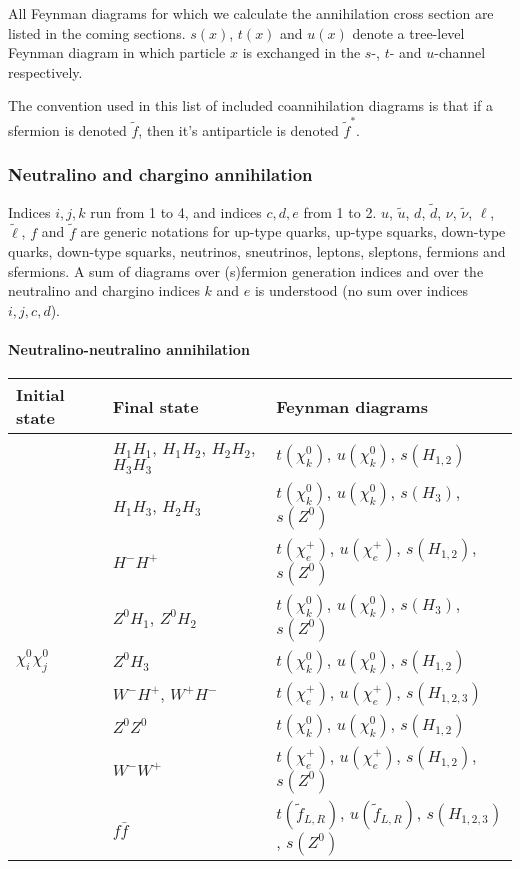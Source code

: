 All Feynman diagrams for which we calculate the 
annihilation cross section are listed in the coming sections.
$s(x)$, $t(x)$ and $u(x)$ denote a
tree-level Feynman diagram in which particle $x$ is exchanged in
the $s$-, $t$- and $u$-channel respectively. 

The convention used in this list of included coannihilation diagrams is that if a sfermion is
denoted $\tilde{f}$, then it's antiparticle is denoted $\tilde{f}^*$.

\subsubsection{Neutralino and chargino annihilation}

Indices $i,j,k$ run
from 1 to 4, and indices $c,d,e$ from 1 to 2.  $u$, $\tilde{u}$,
$d$, $\tilde{d}$, $\nu$, $\tilde{\nu}$, $\ell$, $\tilde{\ell}$,
$f$ and $\tilde{f}$ are generic notations for up-type quarks,
up-type squarks, down-type quarks, down-type squarks, neutrinos,
sneutrinos, leptons, sleptons, fermions and sfermions.  A sum of
diagrams over (s)fermion generation indices and over the
neutralino and chargino indices $k$ and $e$ is understood (no sum
over indices $i,j,c,d$).

\paragraph{Neutralino-neutralino annihilation}

\begin{center}  
\begin{tabular}{lll} \hline 
  Initial state & Final state & Feynman diagrams \\ \hline \tabspace
   & $H_1 H_1$, $H_1 H_2$, $H_2 H_2$, $H_3 H_3$ &
  $t(\chi_k^0)$, $u(\chi_k^0)$, $s(H_{1,2})$ \\
   & $H_1 H_3$, $H_2 H_3$ &
  $t(\chi_k^0)$, $u(\chi_k^0)$, $s(H_{3})$, $s(Z^0)$ \\
   & $H^- H^+$ &
  $t(\chi_e^+)$, $u(\chi_e^+)$, $s(H_{1,2})$, $s(Z^0)$ \\
   & $Z^0 H_1$, $Z^0 H_2$ &
  $t(\chi_k^0)$, $u(\chi_k^0)$, $s(H_{3})$, $s(Z^0)$ \\
  $\chi_i^0 \chi_j^0$ & $Z^0 H_3$ &
  $t(\chi_k^0)$, $u(\chi_k^0)$, $s(H_{1,2})$ \\
   & $W^- H^+$, $W^+ H^-$ &
  $t(\chi_e^+)$, $u(\chi_e^+)$, $s(H_{1,2,3})$ \\
   & $Z^0 Z^0$ &
  $t(\chi_k^0)$, $u(\chi_k^0)$, $s(H_{1,2})$ \\
   & $W^- W^+$ &
  $t(\chi_e^+)$, $u(\chi_e^+)$, $s(H_{1,2})$, $s(Z^0)$ \\
   & $f \bar{f}$ &
  $t(\tilde{f}_{L,R})$, $u(\tilde{f}_{L,R})$, $s(H_{1,2,3})$,
  $s(Z^0)$ \\ \hline  
\end{tabular}
\end{center}


